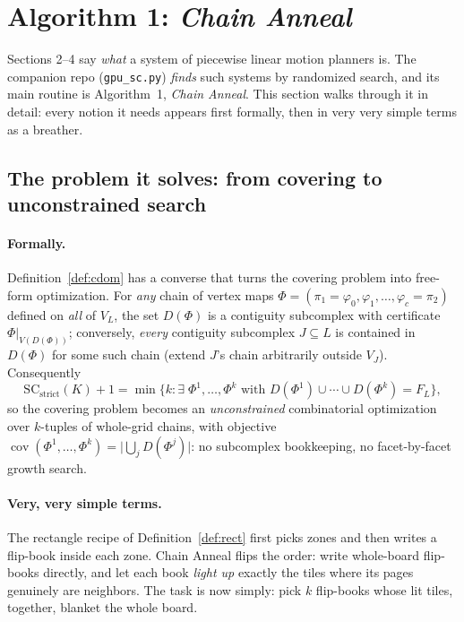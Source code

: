 \documentclass[11pt]{article}
\theoremstyle{definition}
\begin{document}
\section{Algorithm 1: \emph{Chain Anneal}}
\label{sec:anneal}

Sections 2--4 say \emph{what} a system of piecewise linear motion planners
is. The companion repo (\texttt{gpu\_sc.py}) \emph{finds} such systems by
randomized search, and its main routine is Algorithm~1, \emph{Chain Anneal}.
This section walks through it in detail: every notion it needs appears first
formally, then in very very simple terms as a breather.

\subsection{The problem it solves: from covering to unconstrained search}

\paragraph{Formally.}
Definition~\ref{def:cdom} has a converse that turns the covering problem
into free-form optimization. For \emph{any} chain of vertex maps
$\Phi = (\pi_1 = \varphi_0, \varphi_1, \dots, \varphi_c = \pi_2)$ defined on
\emph{all} of $V_L$, the set $D(\Phi)$ is a contiguity subcomplex with
certificate $\Phi|_{V(D(\Phi))}$; conversely, \emph{every} contiguity
subcomplex $J \subseteq L$ is contained in $D(\Phi)$ for some such chain
(extend $J$'s chain arbitrarily outside $V_J$). Consequently
\[
\mathrm{SC}_{\mathrm{strict}}(K) + 1
= \min\bigl\{ k : \exists\; \Phi^1, \dots, \Phi^k
\text{ with } D(\Phi^1) \cup \cdots \cup D(\Phi^k) = F_L \bigr\},
\]
so the covering problem becomes an \emph{unconstrained} combinatorial
optimization over $k$-tuples of whole-grid chains, with objective
$\operatorname{cov}(\Phi^1, \dots, \Phi^k) =
\bigl|\bigcup_j D(\Phi^j)\bigr|$: no subcomplex bookkeeping, no facet-by-facet
growth search.

\paragraph{Very, very simple terms.}
The rectangle recipe of Definition~\ref{def:rect} first picks zones and then
writes a flip-book inside each zone. Chain Anneal flips the order: write
whole-board flip-books directly, and let each book \emph{light up} exactly
the tiles where its pages genuinely are neighbors. The task is now simply:
pick $k$ flip-books whose lit tiles, together, blanket the whole board.
\end{document}

